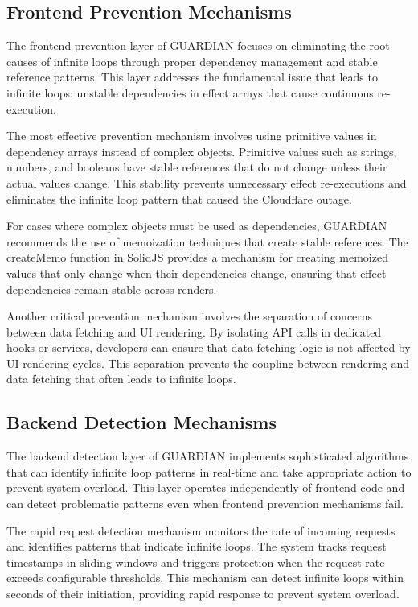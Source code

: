 \documentclass[10pt]{article}
\begin{document}
\subsection{Frontend Prevention Mechanisms}

The frontend prevention layer of GUARDIAN focuses on eliminating the root causes of infinite loops through proper dependency management and stable reference patterns. This layer addresses the fundamental issue that leads to infinite loops: unstable dependencies in effect arrays that cause continuous re-execution.

The most effective prevention mechanism involves using primitive values in dependency arrays instead of complex objects. Primitive values such as strings, numbers, and booleans have stable references that do not change unless their actual values change. This stability prevents unnecessary effect re-executions and eliminates the infinite loop pattern that caused the Cloudflare outage.

For cases where complex objects must be used as dependencies, GUARDIAN recommends the use of memoization techniques that create stable references. The createMemo function in SolidJS provides a mechanism for creating memoized values that only change when their dependencies change, ensuring that effect dependencies remain stable across renders.

Another critical prevention mechanism involves the separation of concerns between data fetching and UI rendering. By isolating API calls in dedicated hooks or services, developers can ensure that data fetching logic is not affected by UI rendering cycles. This separation prevents the coupling between rendering and data fetching that often leads to infinite loops.

\subsection{Backend Detection Mechanisms}

The backend detection layer of GUARDIAN implements sophisticated algorithms that can identify infinite loop patterns in real-time and take appropriate action to prevent system overload. This layer operates independently of frontend code and can detect problematic patterns even when frontend prevention mechanisms fail.

The rapid request detection mechanism monitors the rate of incoming requests and identifies patterns that indicate infinite loops. The system tracks request timestamps in sliding windows and triggers protection when the request rate exceeds configurable thresholds. This mechanism can detect infinite loops within seconds of their initiation, providing rapid response to prevent system overload.
\end{document}
